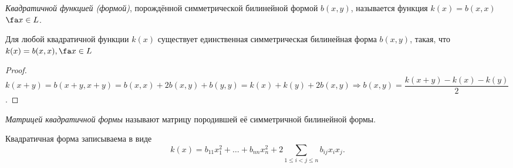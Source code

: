   \begin{defn}
  \textit{Квадратичной функцией (формой)}, порождённой симметрической билинейной формой $ b(x,y) $, называется функция $k(x)=b(x,x)$  $\fa x \in L$.
  \end{defn}
  \begin{stt}
  Для любой квадратичной функции $k(x)$ существует единственная симметрическая билинейная форма $b(x,y)$, такая, что $k(x)=b(x,x), \fa x \in L$
  \end{stt}
  \begin{proof}
  $k(x+y)=b(x+y,x+y)=b(x,x)+2b(x,y)+b(y,y)=k(x)+k(y)+2b(x,y) \Rightarrow b(x,y)=\dfrac{k(x+y)-k(x)-k(y)}{2}$.
  \end{proof}
  \begin{defn}
  \textit{Матрицей квадратичной формы} называют матрицу породившей её симметричной билинейной формы.
  \end{defn}
  Квадратичная форма записываема в виде 			  \begin{equation}\label{24.1.common}
  k(x)=b_{11}x_1^2+\ldots+b_{nn}x_n^2+2\sum\limits_{1\le i<j\le n} b_{ij}x_ix_j.
  \end{equation} 
